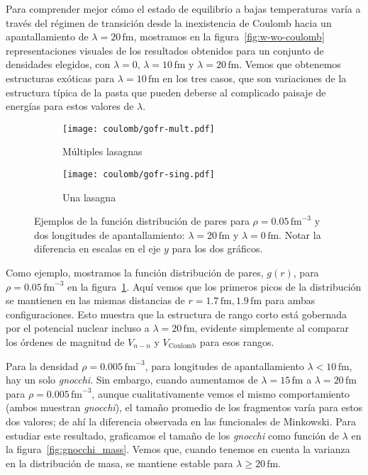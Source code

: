 Para comprender mejor cómo el estado de equilibrio a bajas temperaturas varía a través del régimen de transición desde la inexistencia de Coulomb hacia un apantallamiento de $\lambda=20\,\text{fm}$, mostramos en la figura~\ref{fig:w-wo-coulomb} representaciones visuales de los resultados obtenidos para un conjunto de densidades elegidos, con $\lambda=0$, $\lambda=10\,\text{fm}$ y $\lambda=20\,\text{fm}$.
Vemos que obtenemos estructuras exóticas para $\lambda=10\,\text{fm}$ en los tres casos, que son variaciones de la estructura típica de la pasta que pueden deberse al complicado paisaje de energías para estos valores de $\lambda$.

\begin{figure}[h!]  %
\centering
\begin{subfigure}[h!]{0.48\columnwidth}
  \centering
  \texttt{[image: coulomb/gofr-mult.pdf]}
  \caption{Múltiples lasagnas}
\end{subfigure}
\begin{subfigure}[h!]{0.48\columnwidth}
  \centering
  \texttt{[image: coulomb/gofr-sing.pdf]}
  \caption{Una lasagna}
\end{subfigure}
\caption{Ejemplos de la función distribución de pares para $\rho=0.05\,\text{fm}^{-3}$ y dos longitudes de apantallamiento:
  $\lambda=20\,\text{fm}$ y $\lambda=0\,\text{fm}$.
  Notar la diferencia en escalas en el eje $y$ para los dos gráficos.}
\label{fig:gofr}
\end{figure}

Como ejemplo, mostramos la función distribución de pares, $g(r)$, para $\rho=0.05\,\text{fm}^{-3}$ en la figura~\ref{fig:gofr}.
Aquí vemos que los primeros picos de la distribución se mantienen en las mismas distancias de $r=1.7\,\text{fm}, 1.9\,\text{fm}$ para ambas configuraciones.
Esto muestra que la estructura de rango corto está gobernada por el potencial nuclear incluso a $\lambda=20\,\text{fm}$, evidente simplemente al comparar los órdenes de magnitud de $V_{n-n}$ y $V_{\text{Coulomb}}$ para esos rangos.

Para la densidad $\rho=0.005\,\text{fm}^{-3}$, para longitudes de apantallamiento $\lambda<10\,\text{fm}$, hay un solo \emph{gnocchi}.
Sin embargo, cuando aumentamos de $\lambda=15\,\text{fm}$ a $\lambda=20\,\text{fm}$ para $\rho=0.005\,\text{fm}^{-3}$, aunque cualitativamente vemos el mismo comportamiento (ambos muestran \emph{gnocchi}), el tamaño promedio de los fragmentos varía para estos dos valores; de ahí la diferencia observada en las funcionales de Minkowski.
Para estudiar este resultado, graficamos el tamaño de los \emph{gnocchi} como función de $\lambda$ en la figura~\ref{fig:gnocchi_mass}.
Vemos que, cuando tenemos en cuenta la varianza en la distribución de masa, se mantiene estable para $\lambda\geq20\,\text{fm}$.

